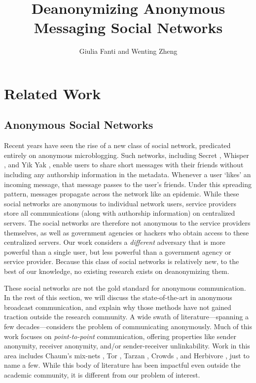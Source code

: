 \documentclass[10pt, twocolumn]{article}
\begin{document}
\title{Deanonymizing Anonymous Messaging Social Networks}

\author{Giulia Fanti and Wenting Zheng}

   \date{}
   \maketitle
   \thispagestyle{empty}
\section{Related Work}

\subsection{Anonymous Social Networks} 
Recent years have seen the rise of a new class of social network, predicated entirely on anonymous microblogging.
Such networks, including Secret \cite{secret}, Whisper \cite{whisper}, and Yik Yak \cite{yikyak}, enable users to share short messages with their friends without including any authorship information in the metadata. 
Whenever a user `likes' an incoming message, that message passes to the user's friends.
Under this spreading pattern, messages propagate across the network like an epidemic.
While these social networks are anonymous to individual network users, service providers store all communications (along with authorship information) on centralized servers.
The social networks are therefore not anonymous to the service providers themselves, as well as government agencies or hackers who obtain access to these centralized servers.
Our work considers a \emph{different} adversary that is more powerful than a single user, but less powerful than a government agency or service provider.
Because this class of social networks is relatively new, to the best of our knowledge, no existing research exists on deanonymizing them.

These social networks are not the gold standard for anonymous communication. In the rest of this section, we will discuss the state-of-the-art in anonymous broadcast communication, and explain why those methods have not gained traction outside the research community.
A wide swath of literature---spanning a few decades---considers the problem of communicating anonymously.
Much of this work focuses on \emph{point-to-point} communication, offering properties like sender anonymity, receiver anonymity, and/or sender-receiver unlinkability. 
Work in this area includes Chaum's mix-nets \cite{chaum1981untraceable}, Tor \cite{tor}, Tarzan \cite{tarzan}, Crowds \cite{reiter1998crowds}, and Herbivore \cite{goel2003herbivore}, just to name a few.
While this body of literature has been impactful even outside the academic community, it is different from our problem of interest.
\end{document}
